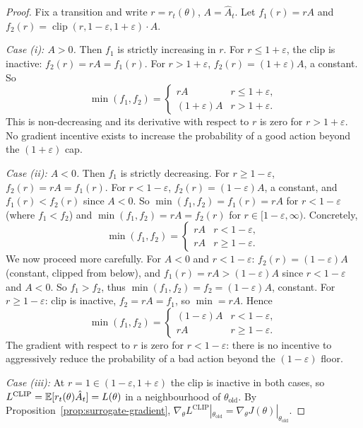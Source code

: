 \begin{proof}
Fix a transition and write $r = r_t(\theta)$, $A = \hat{A}_t$.
Let $f_1(r) = r A$ and $f_2(r) = \operatorname{clip}(r, 1-\varepsilon, 1+\varepsilon)\cdot A$.

\medskip
\textit{Case (i): $A > 0$.}
Then $f_1$ is strictly increasing in $r$.  For $r \leq 1+\varepsilon$,
the clip is inactive: $f_2(r) = rA = f_1(r)$.  For $r > 1+\varepsilon$,
$f_2(r) = (1+\varepsilon)A$, a constant.  So
\[
\min(f_1, f_2)
= \begin{cases} rA & r \leq 1+\varepsilon, \\ (1+\varepsilon)A & r > 1+\varepsilon.\end{cases}
\]
This is non-decreasing and its derivative with respect to $r$ is zero for
$r > 1+\varepsilon$.  No gradient incentive exists to increase the
probability of a good action beyond the $(1+\varepsilon)$ cap.

\medskip
\textit{Case (ii): $A < 0$.}
Then $f_1$ is strictly decreasing.  For $r \geq 1-\varepsilon$, $f_2(r) = rA = f_1(r)$.
For $r < 1-\varepsilon$, $f_2(r) = (1-\varepsilon)A$, a constant, and
$f_1(r) < f_2(r)$ since $A < 0$.  So $\min(f_1, f_2) = f_1(r) = rA$ for
$r < 1-\varepsilon$ (where $f_1 < f_2$) and $\min(f_1,f_2) = rA = f_2(r)$
for $r \in [1-\varepsilon, \infty)$.  Concretely,
\[
\min(f_1, f_2)
= \begin{cases} rA & r < 1-\varepsilon, \\ rA & r \geq 1-\varepsilon. \end{cases}
\]
We now proceed more carefully.  For $A < 0$ and $r < 1-\varepsilon$:
$f_2(r) = (1-\varepsilon)A$ (constant, clipped from below), and
$f_1(r) = rA > (1-\varepsilon)A$ since $r < 1-\varepsilon$ and $A<0$.
So $f_1 > f_2$, thus $\min(f_1,f_2) = f_2 = (1-\varepsilon)A$, constant.
For $r \geq 1-\varepsilon$: clip is inactive, $f_2 = rA = f_1$,
so $\min = rA$.  Hence
\[
\min(f_1, f_2)
= \begin{cases} (1-\varepsilon)A & r < 1-\varepsilon, \\ rA & r \geq 1-\varepsilon.\end{cases}
\]
The gradient with respect to $r$ is zero for $r < 1-\varepsilon$:
there is no incentive to aggressively reduce the probability of a bad action
beyond the $(1-\varepsilon)$ floor.

\medskip
\textit{Case (iii):} At $r = 1 \in (1-\varepsilon, 1+\varepsilon)$ the clip
is inactive in both cases, so $L^{\mathrm{CLIP}} = \operatorname{\mathbb{E}}[r_t(\theta)\hat{A}_t]
= L(\theta)$ in a neighbourhood of $\theta_\mathrm{old}$.
By Proposition~\ref{prop:surrogate-gradient}, $\nabla_\theta L^{\mathrm{CLIP}}
|_{\theta_\mathrm{old}} = \nabla_\theta J(\theta)|_{\theta_\mathrm{old}}$.
\end{proof}

